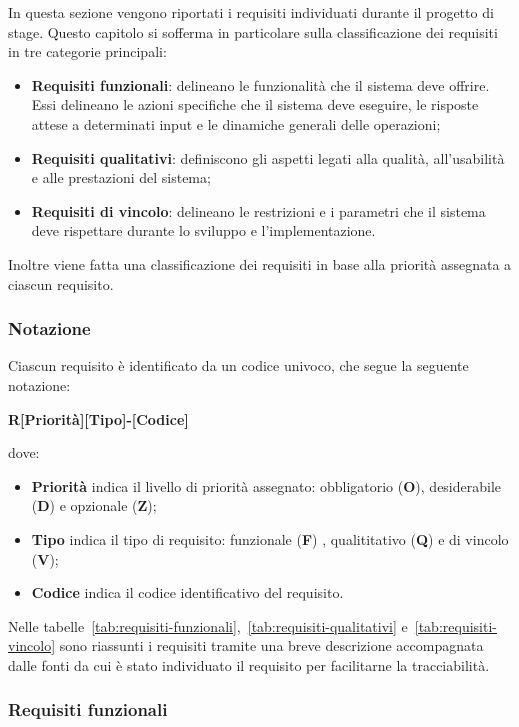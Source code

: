 In questa sezione vengono riportati i requisiti individuati durante il progetto di stage.
Questo capitolo si sofferma in particolare sulla classificazione dei requisiti in tre categorie principali:
\begin{itemize}
    \item \textbf{Requisiti funzionali}: delineano le funzionalità che il sistema deve offrire. Essi delineano le azioni specifiche che il sistema deve eseguire, le risposte attese a determinati input e le dinamiche generali delle operazioni;
    \item\textbf{Requisiti qualitativi}: definiscono gli aspetti legati alla qualità, all'usabilità e alle prestazioni del sistema;
    \item \textbf{Requisiti di vincolo}: delineano le restrizioni e i parametri che il sistema deve rispettare durante lo sviluppo e l'implementazione. 
\end{itemize}

Inoltre viene fatta una classificazione dei requisiti in base alla priorità assegnata a ciascun requisito.

\subsubsection{Notazione}
Ciascun requisito è identificato da un codice univoco, che segue la seguente notazione:
\begin{center}
    \textbf{R[Priorità][Tipo]-[Codice]}
\end{center}
  dove:
  \begin{itemize}
  \item \textbf{Priorità} indica il livello di priorità assegnato: obbligatorio (\textbf{O}), desiderabile (\textbf{D}) e opzionale (\textbf{Z});
  \item \textbf{Tipo} indica il tipo di requisito: funzionale (\textbf{F}) , qualititativo (\textbf{Q}) e di vincolo (\textbf{V});
  \item \textbf{Codice} indica il codice identificativo del requisito.
  \end{itemize}

Nelle tabelle~\ref{tab:requisiti-funzionali},~\ref{tab:requisiti-qualitativi} e~\ref{tab:requisiti-vincolo} sono riassunti i requisiti tramite una breve descrizione accompagnata dalle fonti da cui è stato individuato il requisito per
facilitarne la tracciabilità. 

\pagebreak

\subsubsection{Requisiti funzionali}

